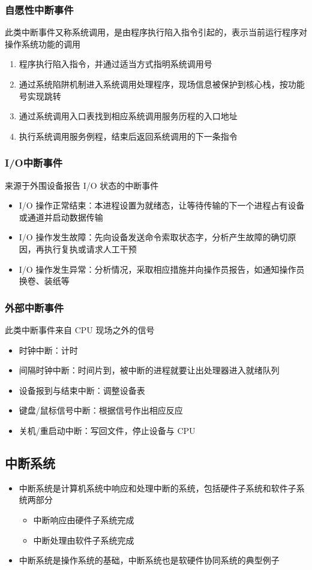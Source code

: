 \documentclass[cs4size,a4paper,10pt]{ctexart}
\begin{document}
	\subsubsection{自愿性中断事件}
	此类中断事件又称系统调用，是由程序执行陷入指令引起的，表示当前运行程序对操作系统功能的调用
	\begin{enumerate}[label=\arabic*.]
		\item 程序执行陷入指令，并通过适当方式指明系统调用号
		\item 通过系统陷阱机制进入系统调用处理程序，现场信息被保护到核心栈，按功能号实现跳转
		\item 通过系统调用入口表找到相应系统调用服务历程的入口地址
		\item 执行系统调用服务例程，结束后返回系统调用的下一条指令
	\end{enumerate}


	\subsubsection{I/O中断事件}
	来源于外围设备报告 I/O 状态的中断事件
	\begin{itemize}
		\item I/O 操作正常结束：本进程设置为就绪态，让等待传输的下一个进程占有设备或通道并启动数据传输
		\item I/O 操作发生故障：先向设备发送命令索取状态字，分析产生故障的确切原因，再执行复执或请求人工干预
		\item I/O 操作发生异常：分析情况，采取相应措施并向操作员报告，如通知操作员换卷、装纸等
	\end{itemize}

	\subsubsection{外部中断事件}
	此类中断事件来自 CPU 现场之外的信号
	\begin{itemize}
		\item 时钟中断：计时
		\item 间隔时钟中断：时间片到，被中断的进程就要让出处理器进入就绪队列
		\item 设备报到与结束中断：调整设备表
		\item 键盘/鼠标信号中断：根据信号作出相应反应
		\item 关机/重启动中断：写回文件，停止设备与 CPU
	\end{itemize}


	\subsection{中断系统}
	\begin{itemize}
		\item 中断系统是计算机系统中响应和处理中断的系统，包括硬件子系统和软件子系统两部分
		\begin{itemize}
			\item 中断响应由硬件子系统完成
			\item 中断处理由软件子系统完成
		\end{itemize}
		\item 中断系统是操作系统的基础，中断系统也是软硬件协同系统的典型例子
	\end{itemize}
\end{document}
